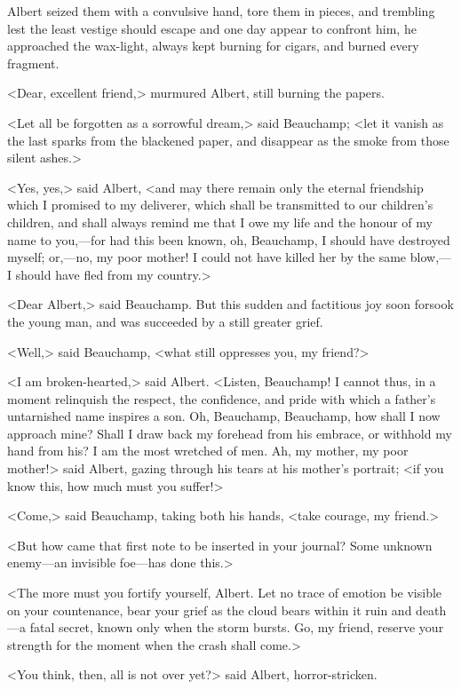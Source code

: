  Albert seized them with a convulsive hand, tore them in pieces, and trembling lest the least vestige should escape and one day appear to confront him, he approached the wax-light, always kept burning for cigars, and burned every fragment. 

 <Dear, excellent friend,> murmured Albert, still burning the papers. 

 <Let all be forgotten as a sorrowful dream,> said Beauchamp; <let it vanish as the last sparks from the blackened paper, and disappear as the smoke from those silent ashes.> 

 <Yes, yes,> said Albert, <and may there remain only the eternal friendship which I promised to my deliverer, which shall be transmitted to our children's children, and shall always remind me that I owe my life and the honour of my name to you,—for had this been known, oh, Beauchamp, I should have destroyed myself; or,—no, my poor mother! I could not have killed her by the same blow,—I should have fled from my country.> 

 <Dear Albert,> said Beauchamp. But this sudden and factitious joy soon forsook the young man, and was succeeded by a still greater grief. 

 <Well,> said Beauchamp, <what still oppresses you, my friend?>

<I am broken-hearted,> said Albert. <Listen, Beauchamp! I cannot thus, in a moment relinquish the respect, the confidence, and pride with which a father's untarnished name inspires a son. Oh, Beauchamp, Beauchamp, how shall I now approach mine? Shall I draw back my forehead from his embrace, or withhold my hand from his? I am the most wretched of men. Ah, my mother, my poor mother!> said Albert, gazing through his tears at his mother's portrait; <if you know this, how much must you suffer!> 

 <Come,> said Beauchamp, taking both his hands, <take courage, my friend.> 

 <But how came that first note to be inserted in your journal? Some unknown enemy—an invisible foe—has done this.> 

 <The more must you fortify yourself, Albert. Let no trace of emotion be visible on your countenance, bear your grief as the cloud bears within it ruin and death—a fatal secret, known only when the storm bursts. Go, my friend, reserve your strength for the moment when the crash shall come.>

<You think, then, all is not over yet?> said Albert, horror-stricken. 

